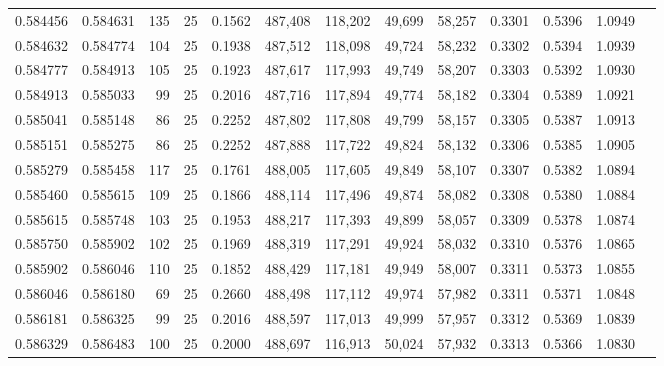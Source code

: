 \begin{tabular}{rrrrrrrrrrrrr}
0.584456 & 0.584631 &   135 &  25 &                                     0.1562 & 487,408 & 118,202 &  49,699 &  58,257 & 0.3301 & 0.5396 & 1.0949 \\
0.584632 & 0.584774 &   104 &  25 &                                     0.1938 & 487,512 & 118,098 &  49,724 &  58,232 & 0.3302 & 0.5394 & 1.0939 \\
0.584777 & 0.584913 &   105 &  25 &                                     0.1923 & 487,617 & 117,993 &  49,749 &  58,207 & 0.3303 & 0.5392 & 1.0930 \\
0.584913 & 0.585033 &    99 &  25 &                                     0.2016 & 487,716 & 117,894 &  49,774 &  58,182 & 0.3304 & 0.5389 & 1.0921 \\
0.585041 & 0.585148 &    86 &  25 &                                     0.2252 & 487,802 & 117,808 &  49,799 &  58,157 & 0.3305 & 0.5387 & 1.0913 \\
0.585151 & 0.585275 &    86 &  25 &                                     0.2252 & 487,888 & 117,722 &  49,824 &  58,132 & 0.3306 & 0.5385 & 1.0905 \\
0.585279 & 0.585458 &   117 &  25 &                                     0.1761 & 488,005 & 117,605 &  49,849 &  58,107 & 0.3307 & 0.5382 & 1.0894 \\
0.585460 & 0.585615 &   109 &  25 &                                     0.1866 & 488,114 & 117,496 &  49,874 &  58,082 & 0.3308 & 0.5380 & 1.0884 \\
0.585615 & 0.585748 &   103 &  25 &                                     0.1953 & 488,217 & 117,393 &  49,899 &  58,057 & 0.3309 & 0.5378 & 1.0874 \\
0.585750 & 0.585902 &   102 &  25 &                                     0.1969 & 488,319 & 117,291 &  49,924 &  58,032 & 0.3310 & 0.5376 & 1.0865 \\
0.585902 & 0.586046 &   110 &  25 &                                     0.1852 & 488,429 & 117,181 &  49,949 &  58,007 & 0.3311 & 0.5373 & 1.0855 \\
0.586046 & 0.586180 &    69 &  25 &                                     0.2660 & 488,498 & 117,112 &  49,974 &  57,982 & 0.3311 & 0.5371 & 1.0848 \\
0.586181 & 0.586325 &    99 &  25 &                                     0.2016 & 488,597 & 117,013 &  49,999 &  57,957 & 0.3312 & 0.5369 & 1.0839 \\
0.586329 & 0.586483 &   100 &  25 &                                     0.2000 & 488,697 & 116,913 &  50,024 &  57,932 & 0.3313 & 0.5366 & 1.0830 \\

\end{tabular}
